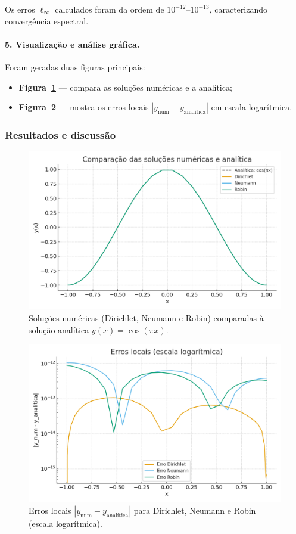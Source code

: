 \documentclass[12pt,a4paper]{article}
\begin{document}
Os erros \(\ell_\infty\) calculados foram da ordem de \(10^{-12}\)–\(10^{-13}\), caracterizando convergência espectral.

\paragraph{5. Visualização e análise gráfica.}
Foram geradas duas figuras principais:
\begin{itemize}
    \item \textbf{Figura~\ref{fig:ex6_all_solutions}} — compara as soluções numéricas e a analítica;
    \item \textbf{Figura~\ref{fig:ex6_error_plot}} — mostra os erros locais \(|y_\text{num}-y_\text{analítica}|\) em escala logarítmica.
\end{itemize}

\subsubsection{Resultados e discussão}

\begin{figure}[H]
  \centering
  \includegraphics[width=.8\linewidth]{figures/y_all_combined.png}
  \caption{Soluções numéricas (Dirichlet, Neumann e Robin) comparadas à solução analítica \(y(x)=\cos(\pi x)\).}
  \label{fig:ex6_all_solutions}
\end{figure}

\begin{figure}[H]
  \centering
  \includegraphics[width=.8\linewidth]{figures/y_error_comparison.png}
  \caption{Erros locais \(|y_\text{num}-y_\text{analítica}|\) para Dirichlet, Neumann e Robin (escala logarítmica).}
  \label{fig:ex6_error_plot}
\end{figure}
\end{document}
